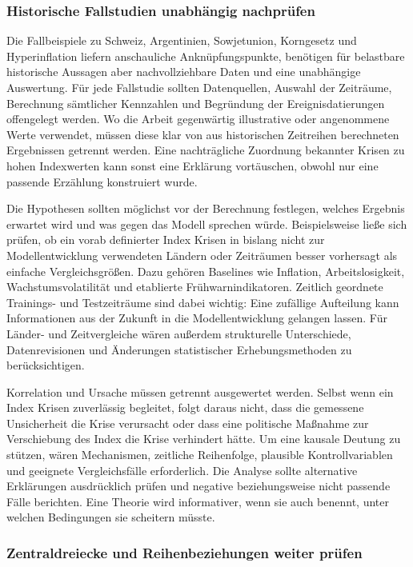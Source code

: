 \documentclass[a4paper,12pt,twoside]{report}
\theoremstyle{definition}
\begin{document}
\subsubsection{Historische Fallstudien unabhängig nachprüfen}

Die Fallbeispiele zu Schweiz, Argentinien, Sowjetunion, Korngesetz und Hyperinflation liefern anschauliche Anknüpfungspunkte, benötigen für belastbare historische Aussagen aber nachvollziehbare Daten und eine unabhängige Auswertung. Für jede Fallstudie sollten Datenquellen, Auswahl der Zeiträume, Berechnung sämtlicher Kennzahlen und Begründung der Ereignisdatierungen offengelegt werden. Wo die Arbeit gegenwärtig illustrative oder angenommene Werte verwendet, müssen diese klar von aus historischen Zeitreihen berechneten Ergebnissen getrennt werden. Eine nachträgliche Zuordnung bekannter Krisen zu hohen Indexwerten kann sonst eine Erklärung vortäuschen, obwohl nur eine passende Erzählung konstruiert wurde.

Die Hypothesen sollten möglichst vor der Berechnung festlegen, welches Ergebnis erwartet wird und was gegen das Modell sprechen würde. Beispielsweise ließe sich prüfen, ob ein vorab definierter Index Krisen in bislang nicht zur Modellentwicklung verwendeten Ländern oder Zeiträumen besser vorhersagt als einfache Vergleichsgrößen. Dazu gehören Baselines wie Inflation, Arbeitslosigkeit, Wachstumsvolatilität und etablierte Frühwarnindikatoren. Zeitlich geordnete Trainings- und Testzeiträume sind dabei wichtig: Eine zufällige Aufteilung kann Informationen aus der Zukunft in die Modellentwicklung gelangen lassen. Für Länder- und Zeitvergleiche wären außerdem strukturelle Unterschiede, Datenrevisionen und Änderungen statistischer Erhebungsmethoden zu berücksichtigen.

Korrelation und Ursache müssen getrennt ausgewertet werden. Selbst wenn ein Index Krisen zuverlässig begleitet, folgt daraus nicht, dass die gemessene Unsicherheit die Krise verursacht oder dass eine politische Maßnahme zur Verschiebung des Index die Krise verhindert hätte. Um eine kausale Deutung zu stützen, wären Mechanismen, zeitliche Reihenfolge, plausible Kontrollvariablen und geeignete Vergleichsfälle erforderlich. Die Analyse sollte alternative Erklärungen ausdrücklich prüfen und negative beziehungsweise nicht passende Fälle berichten. Eine Theorie wird informativer, wenn sie auch benennt, unter welchen Bedingungen sie scheitern müsste.

\subsubsection{Zentraldreiecke und Reihenbeziehungen weiter prüfen}
\end{document}
